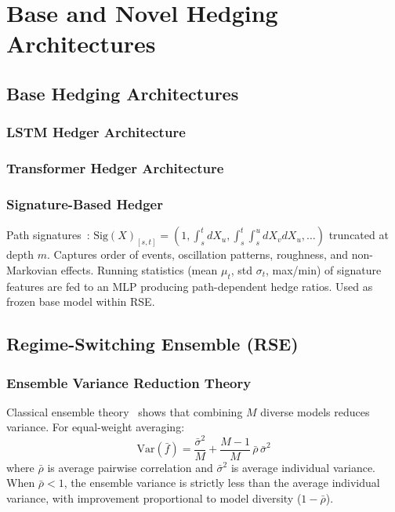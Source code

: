 
\section{Base and Novel Hedging Architectures}
\label{sec:architectures}

\subsection{Base Hedging Architectures}
\label{sec:base}

\subsubsection{LSTM Hedger Architecture}



\subsubsection{Transformer Hedger Architecture}


\subsubsection{Signature-Based Hedger}

Path signatures~\citep{lyons1998differential}: $\mathrm{Sig}(X)_{[s,t]} = (1, \int_s^t dX_u, \int_s^t\int_s^u dX_v dX_u, \ldots)$ truncated at depth $m$. Captures order of events, oscillation patterns, roughness, and non-Markovian effects. Running statistics (mean $\mu_t$, std $\sigma_t$, max/min) of signature features are fed to an MLP producing path-dependent hedge ratios. Used as frozen base model within RSE.

\subsection{Regime-Switching Ensemble (RSE)}
\label{sec:rse}

\subsubsection{Ensemble Variance Reduction Theory}

Classical ensemble theory~\citep{dietterich2000ensemble} shows that combining $M$ diverse models reduces variance. For equal-weight averaging:
\begin{equation}
    \mathrm{Var}(\bar{f}) = \frac{\bar\sigma^2}{M} + \frac{M-1}{M}\,\bar\rho\,\bar\sigma^2
    \label{eq:ensemble_classical}
\end{equation}
where $\bar{\rho}$ is average pairwise correlation and $\bar\sigma^2$ is average individual variance. When $\bar\rho < 1$, the ensemble variance is strictly less than the average individual variance, with improvement proportional to model diversity ($1-\bar\rho$).

